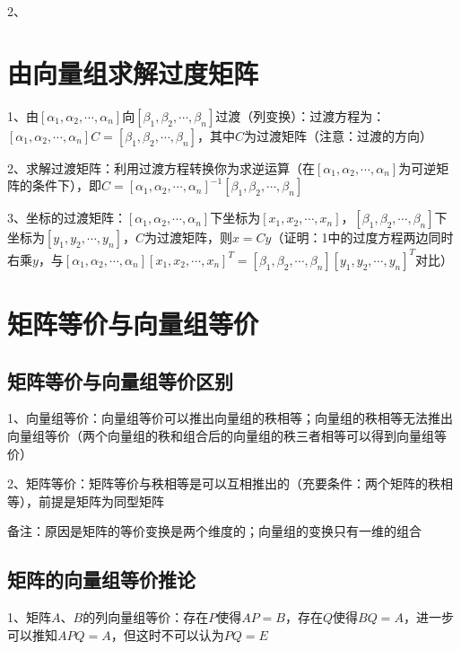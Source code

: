 2、

\section{由向量组求解过度矩阵}

1、由$[\alpha_1,\alpha_2,\cdots,\alpha_n]$向$[\beta_1,\beta_2,\cdots,\beta_n]$过渡（列变换）：过渡方程为：$[\alpha_1,\alpha_2,\cdots,\alpha_n]C=[\beta_1,\beta_2,\cdots,\beta_n]$，其中$C$为过渡矩阵（注意：过渡的方向）

2、求解过渡矩阵：利用过渡方程转换你为求逆运算（在$[\alpha_1,\alpha_2,\cdots,\alpha_n]$为可逆矩阵的条件下），即$C=[\alpha_1,\alpha_2,\cdots,\alpha_n]^{-1}[\beta_1,\beta_2,\cdots,\beta_n]$

3、坐标的过渡矩阵：$[\alpha_1,\alpha_2,\cdots,\alpha_n]$下坐标为$[x_1,x_2,\cdots,x_n]$，$[\beta_1,\beta_2,\cdots,\beta_n]$下坐标为$[y_1,y_2,\cdots,y_n]$，$C$为过渡矩阵，则$x=Cy$（证明：1中的过度方程两边同时右乘$y$，与$[\alpha_1,\alpha_2,\cdots,\alpha_n][x_1,x_2,\cdots,x_n]^T=[\beta_1,\beta_2,\cdots,\beta_n][y_1,y_2,\cdots,y_n]^T$对比）

\section{矩阵等价与向量组等价}



\subsection{矩阵等价与向量组等价区别}

1、向量组等价：向量组等价可以推出向量组的秩相等；向量组的秩相等无法推出向量组等价（两个向量组的秩和组合后的向量组的秩三者相等可以得到向量组等价）

2、矩阵等价：矩阵等价与秩相等是可以互相推出的（充要条件：两个矩阵的秩相等），前提是矩阵为同型矩阵

备注：原因是矩阵的等价变换是两个维度的；向量组的变换只有一维的组合



\subsection{矩阵的向量组等价推论}

1、矩阵$A、B$的列向量组等价：存在$P$使得$AP=B$，存在$Q$使得$BQ=A$，进一步可以推知$APQ=A$，但这时不可以认为$PQ=E$


